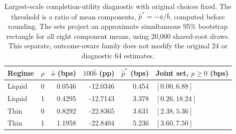 \begin{table}[t]\centering\small
\begin{tabular}{@{}lrrrrl@{}}\toprule
Regime & $\rho$ & $\bar a$ (bps) & $100\bar b$ (pp) & $\widehat p^*$ (bps) & Joint set, $p\geq0$ (bps)\\\midrule
Liquid & 0 & 0.0546 & -12.0346 & 0.454 & $[0.00,6.88]$\\
Liquid & 1 & 0.4295 & -12.7143 & 3.378 & $[0.26,18.24]$\\
Thin & 0 & 0.8292 & -22.8365 & 3.631 & $[2.38,5.36]$\\
Thin & 1 & 1.1958 & -22.8404 & 5.236 & $[3.60,7.50]$\\
\bottomrule\end{tabular}
\caption{Largest-scale completion-utility diagnostic with original choices fixed. The threshold is a ratio of mean components, $\widehat p^*=-\bar a/\bar b$, computed before rounding. The sets project an approximate simultaneous 95\% bootstrap rectangle for all eight component means, using 20,000 shared-root draws. This separate, outcome-aware family does not modify the original 24 or diagnostic 64 estimates.}\label{tab:break-even}
\end{table}
